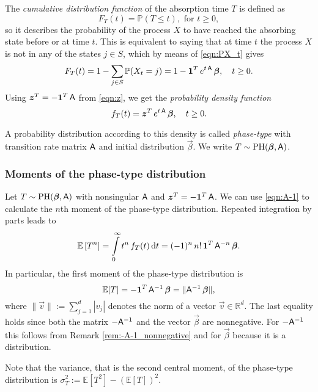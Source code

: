\documentclass[smallextended]{svjour3}
\newcommand{\R}{\mathbb{R}}
\renewcommand{\P}{\mathbb{P}}
\newcommand{\E}{\mathbb{E}}
\newcommand{\suml}{\sum\limits}
\newcommand{\intl}{\int\limits}
\begin{document}
The \emph{cumulative distribution function} of the absorption time $T$ is defined as
\[
    F_T(t)=\P(T\leq t),\text{ for }t\geq0,
\]
so it describes the probability of the process $X$ to have reached the absorbing state before or at time $t$.
This is equivalent to saying that at time $t$ the process $X$ is not in any of the states $j\in S$, which by means of \eqref{eqn:PX_t} gives
\[
    F_T(t)=1-\suml_{j\in S} \P(X_t=j) =1-\vec{1}^T\,e^{t\,\tens{A}}\,\vec{\beta},\quad t\geq0.
\]
Using $\vec{z}^T=-\vec{1}^T\,\tens{A}$ from \eqref{eqn:z}, we get the \emph{probability density function}
\begin{equation}\label{eqn:TTdens}
    f_T(t) = \vec{z}^T\, e^{t\,\tens{A}}\,\vec{\beta},\quad t\geq0.
\end{equation}

A probability distribution according to this density is called \emph{phase-type} with transition rate matrix $\mathsf{A}$ and initial distribution $\vec{\beta}$.
We write $T\sim\operatorname{PH}(\vec{\beta},\tens{A})$.

\subsubsection{Moments of the phase-type distribution}
Let $T\sim\operatorname{PH}(\vec{\beta},\tens{A})$ with nonsingular $\mathsf{A}$ and $\vec{z}^T=-\vec{1}^T\,\tens{A}$.
We can use \eqref{eqn:A-1} to calculate the $n$th moment of the phase-type distribution.
Repeated integration by parts leads to
\begin{equation*}
    \E\left[T^n\right] = \intl_0^\infty t^n\,f_T(t)\,\mathrm{d}t = (-1)^n\,n!\,\vec{1}^T\, \tens{A}^{-n}\,\vec{\beta}.
\end{equation*}
In particular, the first moment of the phase-type distribution is
\begin{equation}\label{eqn:TT}
    \E[T] = -\vec{1}^T\, \tens{A}^{-1}\,\vec{\beta} = \|\tens{A}^{-1}\,\vec{\beta}\|,
\end{equation}
where $\|\vec{v}\|:=\sum_{j=1}^d |v_j|$ denotes the norm of a vector $\vec{v}\in\R^d$.
The last equality holds since both the matrix $-\mathsf{A}^{-1}$ and the vector $\vec{\beta}$ are nonnegative.
For $-\mathsf{A}^{-1}$ this follows from Remark \ref{rem:-A-1_nonnegative} and for $\vec{\beta}$ because it is a distribution.

Note that the variance, that is the second central moment, of the phase-type distribution is $\sigma^2_T := \E[T^2] - (\E[T])^2$.
\end{document}
